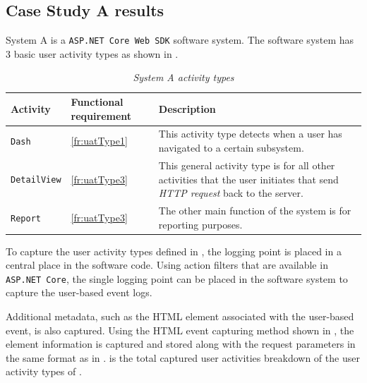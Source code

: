 \subsection{Case Study A results}\label{sec:ch3_csA}
System A is a \texttt{ASP.NET Core Web SDK} software system. The software system has 3 basic user activity types as shown in .

\begin{table}[!htb]
	\centering
	\caption[System A activity types]{\textit{System A activity types}}
	\label{tbl:ch3_systemAActivityTypes}
	\begin{tabularx}{\textwidth}{llX}
		\toprule
		\textbf{Activity} & \textbf{Functional requirement} & \textbf{Description} \\
		\midrule
		\rowcolor{lightgray}
		\texttt{Dash} & \ref{fr:uatType1} & \RaggedRight This activity type detects when a user has navigated to a certain subsystem. \\ 
		\texttt{DetailView} & \ref{fr:uatType3} & \RaggedRight This general activity type is for all other activities that the user initiates that send \textit{HTTP request} back to the server.  \\
		\rowcolor{lightgray}
		\texttt{Report} & \ref{fr:uatType3} & \RaggedRight The other main function of the system is for reporting purposes. \\ 
		\bottomrule
	\end{tabularx}
\end{table}

To capture the user activity types defined in , the logging point is placed in a central place in the software code. Using action filters that are available in \texttt{ASP.NET Core}, the single logging point can be placed in the software system to capture the user-based event logs.\par Additional metadata, such as the HTML element associated with the user-based event, is also captured. Using the HTML event capturing method shown in , the element information is captured and stored along with the request parameters in the same format as in .  is the total captured user activities breakdown of the user activity types of .

